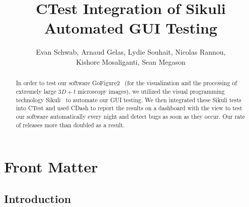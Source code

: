 \documentclass{InsightArticle}
\title{CTest Integration of Sikuli Automated GUI Testing}
\author{Evan Schwab, Arnaud Gelas, Lydie Souhait, Nicolas Rannou,\\
Kishore Mosaliganti, Sean Megason}
\newcommand{\IJhandlerIDnumber}{3196}
\begin{document}
\IJhandlefooter{\IJhandlerIDnumber}


\ifpdf
\else
\fi

\maketitle

\ifhtml
\chapter*{Front Matter\label{front}}
\fi

\begin{abstract}
\noindent
In order to test our software GoFigure2~\cite{GoFigure2:Website} (for the
visualization and the processing of extremely large $3D+t$ microscopy images),
we utilized the visual programming technology Sikuli~\cite{Sikuli:Website} to
automate our GUI testing. We then integrated these Sikuli tests into CTest and
used CDash to report the results on a dashboard with the view to test our
software automatically every night and detect bugs as soon as they occur.  Our
rate of releases more than doubled as a result.
\end{abstract}

\IJhandlenote{\IJhandlerIDnumber}

\tableofcontents
\section{Introduction}

\end{document}
